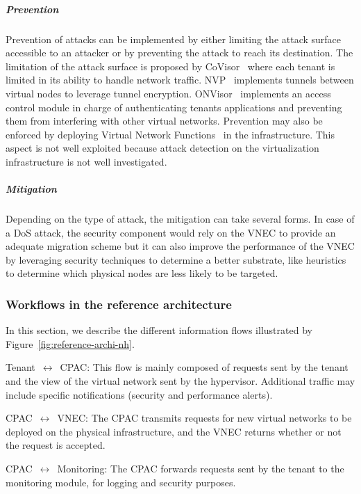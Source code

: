 \subparagraph{Prevention}
Prevention of attacks can be implemented by either limiting the attack surface accessible to an attacker or by preventing the attack to reach its destination. The limitation of the attack surface is proposed by CoVisor~\cite{CoVisor-Jin2015} where each tenant is limited in its ability to handle network traffic.
NVP~\cite{NVP-Koponen2014} implements tunnels between virtual nodes to leverage tunnel encryption.
ONVisor~\cite{ONVisor-Han2018} implements an access control module in charge of authenticating tenants applications and preventing them from interfering with other virtual networks.
Prevention may also be enforced by deploying Virtual Network Functions~\cite{vnf} in the infrastructure. This aspect is not well exploited because attack detection on the virtualization infrastructure is not well investigated. 

\subparagraph{Mitigation}
Depending on the type of attack, the mitigation can take several forms. 
In case of a DoS attack, the security component would rely on the VNEC to provide an adequate migration scheme but it can also improve the performance of the VNEC by leveraging security techniques to determine a better substrate, like heuristics to determine which physical nodes are less likely to be targeted. 

\subsubsection{Workflows in the reference architecture}
In this section, we describe the different information flows illustrated by Figure~\ref{fig:reference-archi-nh}.

 Tenant~$\leftrightarrow$~CPAC: This flow is mainly composed of requests sent by the tenant and the view of the virtual network sent by the hypervisor. Additional traffic may include specific notifications (\eg security and performance alerts).

 CPAC~$\leftrightarrow$~VNEC: The CPAC transmits requests for new virtual networks to be deployed on the physical infrastructure, and the VNEC returns whether or not the request is accepted.

 CPAC~$\leftrightarrow$~Monitoring: The CPAC forwards requests sent by the tenant to the monitoring module, for logging and security purposes. 

